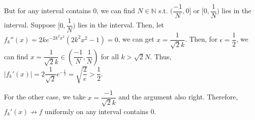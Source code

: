 \documentclass[12pt]{article}
\begin{document}
\begin{enumerate}
\begin{enumerate}
        But for any interval contains $0$, we can find $N \in \mathbb{N}$ s.t. $(\dfrac{-1}{N}, 0]$ or $[0, \dfrac{1}{N})$ lies in the interval.
        Suppose $[0, \dfrac{1}{N})$ lies in the interval.
        Then, let $f_k''(x) = 2ke^{-2k^2x^2}(2k^2x^2 - 1) = 0$, we can get $x = \dfrac{1}{\sqrt{2} k}$.
        Then, for $\epsilon = \dfrac{1}{2}$, we can find $x = \dfrac{1}{\sqrt{2}k} \in (\dfrac{-1}{N}, \dfrac{1}{N})$ for all $k > \sqrt{2}N$.
        Thus, $|f_k'(x)| = 2\dfrac{1}{\sqrt{2}}e^{-\frac{1}{2}} = \sqrt{\dfrac{2}{e}} > \dfrac{1}{2}$.

        For the other case, we take $x = \dfrac{-1}{\sqrt{2}k}$ and the argument also right.
        Therefore, $f_k'(x) \nrightarrow f$ uniformly on any interval contains $0$.
    \end{enumerate}
\end{enumerate}
\end{document}

